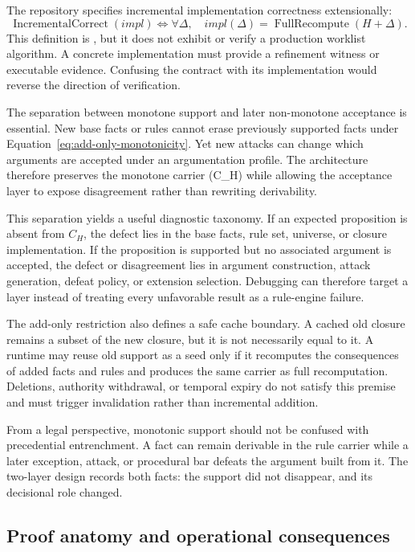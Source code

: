 The repository specifies incremental implementation correctness extensionally:
\begin{equation}
\operatorname{IncrementalCorrect}(impl)\iff
\forall\Delta,\quad impl(\Delta)=
\operatorname{FullRecompute}(H+\Delta).
\label{eq:incremental-correct}
\end{equation}
This definition is \formalized{}, but it does not exhibit or verify a production worklist algorithm. A concrete implementation must provide a refinement witness or executable evidence. Confusing the contract with its implementation would reverse the direction of verification.

The separation between monotone support and later non-monotone acceptance is essential. New base facts or rules cannot erase previously supported facts under Equation~\eqref{eq:add-only-monotonicity}. Yet new attacks can change which arguments are accepted under an argumentation profile. The architecture therefore preserves the monotone carrier (C_H) while allowing the acceptance layer to expose disagreement rather than rewriting derivability.

This separation yields a useful diagnostic taxonomy. If an expected proposition is absent from $C_H$, the defect lies in the base facts, rule set, universe, or closure implementation. If the proposition is supported but no associated argument is accepted, the defect or disagreement lies in argument construction, attack generation, defeat policy, or extension selection. Debugging can therefore target a layer instead of treating every unfavorable result as a rule-engine failure.

The add-only restriction also defines a safe cache boundary. A cached old closure remains a subset of the new closure, but it is not necessarily equal to it. A runtime may reuse old support as a seed only if it recomputes the consequences of added facts and rules and produces the same carrier as full recomputation. Deletions, authority withdrawal, or temporal expiry do not satisfy this premise and must trigger invalidation rather than incremental addition.

From a legal perspective, monotonic support should not be confused with precedential entrenchment. A fact can remain derivable in the rule carrier while a later exception, attack, or procedural bar defeats the argument built from it. The two-layer design records both facts: the support did not disappear, and its decisional role changed.

\subsection{Proof anatomy and operational consequences}

